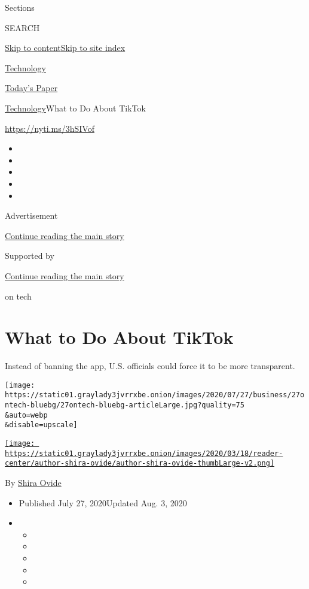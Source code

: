 Sections

SEARCH

\protect\hyperlink{site-content}{Skip to
content}\protect\hyperlink{site-index}{Skip to site index}

\href{https://www.nytimes3xbfgragh.onion/section/technology}{Technology}

\href{https://myaccount.nytimes3xbfgragh.onion/auth/login?response_type=cookie\&client_id=vi}{}

\href{https://www.nytimes3xbfgragh.onion/section/todayspaper}{Today's
Paper}

\href{/section/technology}{Technology}\textbar{}What to Do About TikTok

\href{https://nyti.ms/3hSIVof}{https://nyti.ms/3hSIVof}

\begin{itemize}
\item
\item
\item
\item
\item
\end{itemize}

Advertisement

\protect\hyperlink{after-top}{Continue reading the main story}

Supported by

\protect\hyperlink{after-sponsor}{Continue reading the main story}

on tech

\hypertarget{what-to-do-about-tiktok}{%
\section{What to Do About TikTok}\label{what-to-do-about-tiktok}}

Instead of banning the app, U.S. officials could force it to be more
transparent.

\texttt{[image: https://static01.graylady3jvrrxbe.onion/images/2020/07/27/business/27ontech-bluebg/27ontech-bluebg-articleLarge.jpg?quality=75\\\&auto=webp\\\&disable=upscale]}

\href{https://www.nytimes3xbfgragh.onion/by/shira-ovide}{\texttt{[image: https://static01.graylady3jvrrxbe.onion/images/2020/03/18/reader-center/author-shira-ovide/author-shira-ovide-thumbLarge-v2.png]}}

By \href{https://www.nytimes3xbfgragh.onion/by/shira-ovide}{Shira Ovide}

\begin{itemize}
\item
  Published July 27, 2020Updated Aug. 3, 2020
\item
  \begin{itemize}
  \item
  \item
  \item
  \item
  \item
  \end{itemize}
\end{itemize}

